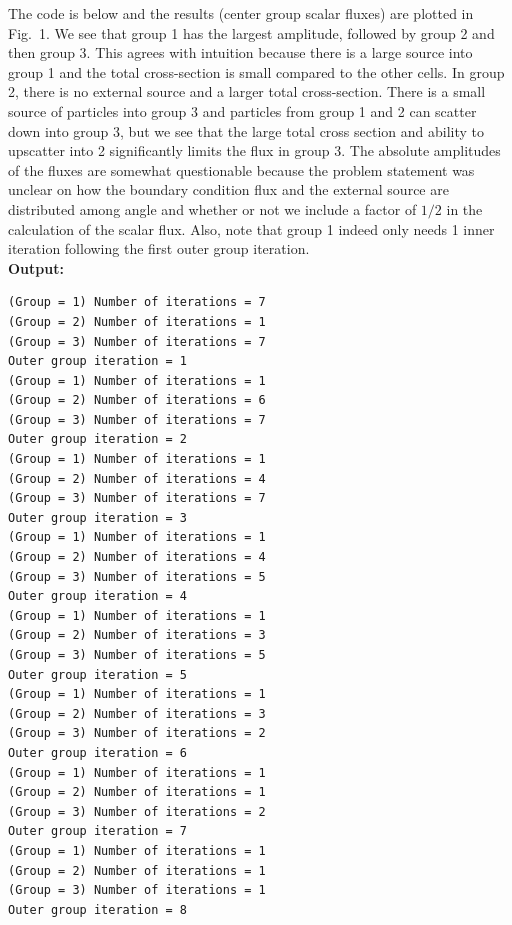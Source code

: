 \documentclass[10pt]{article}
\begin{document}
The code is below and the results (center group scalar fluxes) are plotted in Fig.~1. We see that group 1 has the largest amplitude, followed by group 2 and then group 3. This agrees with intuition because there is a large source into group 1 and the total cross-section is small compared to the other cells. In group 2, there is no external source and a larger total cross-section. There is a small source of particles into group 3 and particles from group 1 and 2 can scatter down into group 3, but we see that the large total cross section and ability to upscatter into 2 significantly limits the flux in group 3. The absolute amplitudes of the fluxes are somewhat questionable because the problem statement was unclear on how the boundary condition flux and the external source are distributed among angle and whether or not we include a factor of $1/2$ in the calculation of the scalar flux. Also, note that group 1 indeed only needs 1 inner iteration following the first outer group iteration.\\



\vspace{10pt}
\textbf{Output:}
\begin{lstlisting}
(Group = 1) Number of iterations = 7
(Group = 2) Number of iterations = 1
(Group = 3) Number of iterations = 7
Outer group iteration = 1
(Group = 1) Number of iterations = 1
(Group = 2) Number of iterations = 6
(Group = 3) Number of iterations = 7
Outer group iteration = 2
(Group = 1) Number of iterations = 1
(Group = 2) Number of iterations = 4
(Group = 3) Number of iterations = 7
Outer group iteration = 3
(Group = 1) Number of iterations = 1
(Group = 2) Number of iterations = 4
(Group = 3) Number of iterations = 5
Outer group iteration = 4
(Group = 1) Number of iterations = 1
(Group = 2) Number of iterations = 3
(Group = 3) Number of iterations = 5
Outer group iteration = 5
(Group = 1) Number of iterations = 1
(Group = 2) Number of iterations = 3
(Group = 3) Number of iterations = 2
Outer group iteration = 6
(Group = 1) Number of iterations = 1
(Group = 2) Number of iterations = 1
(Group = 3) Number of iterations = 2
Outer group iteration = 7
(Group = 1) Number of iterations = 1
(Group = 2) Number of iterations = 1
(Group = 3) Number of iterations = 1
Outer group iteration = 8
\end{lstlisting}
\end{document}
